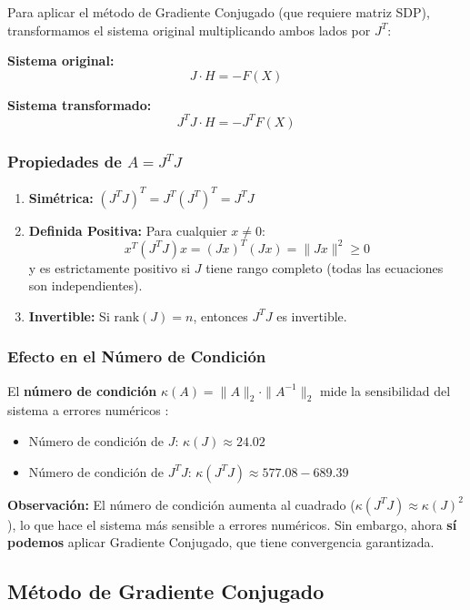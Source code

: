 \documentclass[11pt,letterpaper]{article}
\begin{document}
Para aplicar el método de Gradiente Conjugado (que requiere matriz SDP), transformamos el sistema original multiplicando ambos lados por $J^T$:

\textbf{Sistema original:}
\[
J \cdot H = -F(X)
\]

\textbf{Sistema transformado:}
\[
\boxed{J^T J \cdot H = -J^T F(X)}
\]

\subsubsection{Propiedades de $A = J^T J$}

\begin{enumerate}
    \item \textbf{Simétrica:} $(J^T J)^T = J^T (J^T)^T = J^T J$ \checkmark
    \item \textbf{Definida Positiva:} Para cualquier $x \neq 0$:
    \[
    x^T (J^T J) x = (Jx)^T (Jx) = \|Jx\|^2 \geq 0
    \]
    y es estrictamente positivo si $J$ tiene rango completo (todas las ecuaciones son independientes).
    \item \textbf{Invertible:} Si $\text{rank}(J) = n$, entonces $J^T J$ es invertible.
\end{enumerate}

\subsubsection{Efecto en el Número de Condición}

El \textbf{número de condición} $\kappa(A) = \|A\|_2 \cdot \|A^{-1}\|_2$ mide la sensibilidad del sistema a errores numéricos \cite{Golub}:

\begin{itemize}
    \item Número de condición de $J$: $\kappa(J) \approx 24.02$
    \item Número de condición de $J^T J$: $\kappa(J^T J) \approx 577.08 - 689.39$
\end{itemize}

\textbf{Observación:} El número de condición aumenta al cuadrado ($\kappa(J^T J) \approx \kappa(J)^2$), lo que hace el sistema más sensible a errores numéricos. Sin embargo, ahora \textbf{sí podemos} aplicar Gradiente Conjugado, que tiene convergencia garantizada.

\subsection{Método de Gradiente Conjugado}
\end{document}
